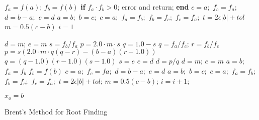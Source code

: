 \begin{center}
\begin{minipage}{6 in}
\begin{small}
\begin{algorithm}[H]

    \SetLine {}
    $f_a = f(a)$; $f_b = f(b)$\;
    \textbf{if} $f_a \cdot f_b > 0$; error and return; \textbf{end} \;
    $c = a;$ $f_c = f_a;$ $d = b - a;$ $e = d$\;
    {
     $a = b;$ $b = c;$ $c = a;$
    $f_a = f_b;$ $f_b = f_c;$ $f_c = f_a;$
    }
    $t = 2\epsilon | b | + tol$\;
    $m = 0.5(c - b)$ \;
    $i = 1$\;
        {
          {
           $d = m$; $ e = m$\;
          }{
           $s = f_b/f_a$\;  %
              {
              $p = 2.0 \cdot m \cdot s$\;
              $q = 1.0 - s$\;
               }
              {
                $q = f_a/f_c$; $r = f_b/f_c$\;
                $p = s(2.0 \cdot m \cdot q (q-r) - (b - a)(r - 1.0))$\;
                $q = (q - 1.0)(r - 1.0)(s - 1.0)$\;
                }
        $s = e$\;  %
        $e = d$\;
           {
            $d = p/q$\;
         }{
            $d = m$; $e = m$\;
         }
       }
       $a  = b$; $f_a = f_b$\;
        {
        }
       $ f_b = f(b)$\;
         {
            $c = a;$ $f_c = fa;$ $d = b - a;$ $e = d$\;
            }
         {
            {
             $a = b;$ $b = c;$ $c = a;$
            $f_a = f_b;$ $f_b = f_c;$ $f_c = f_a;$
            }
                 }
        $t = 2\epsilon |b| + tol$; %
        $m    = 0.5(c - b)$;
        $ i = i + 1$;

    }
    $x_o = b$\;
    \hspace{.2 in}
    \label{alg:BrentsMethod}\caption{Brent's Method for Root Finding}
\end{algorithm}
\end{small}
\end{minipage}
\end{center}

